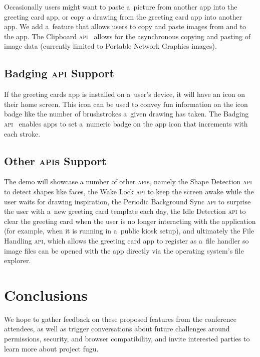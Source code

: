\documentclass[sigconf, anonymous]{acmart}
\begin{document}
Occasionally users might want to paste a~picture from another app into the greeting card app,
or copy a drawing from the greeting card app into another app.
We add a~feature that allows users to copy and paste images from and to the app.
The Clipboard \textsc{api}~\cite{kacmarcik19} allows for the asynchronous copying and pasting
of image data (currently limited to Portable Network Graphics images).

\subsection{Badging \textsc{api} Support}

If the greeting cards app is installed on a~user's device,
it will have an icon on their home screen.
This icon can be used to convey fun information on the icon badge
like the number of brushstrokes a~given drawing has taken.
The Badging \textsc{api}~\cite{giuca19} enables apps to set a~numeric badge on the app icon
that increments with each stroke.

\subsection{Other \textsc{api}s Support}

The demo will showcase a number of other \textsc{api}s, namely the
Shape Detection \textsc{api} to detect shapes like faces,
the Wake Lock  \textsc{api} to keep the screen awake
while the user waits for drawing inspiration, 
the Periodic Background Sync  \textsc{api} to surprise the user
with a~new greeting card template each day,
the Idle Detection \textsc{api} to clear the greeting card
when the user is no longer interacting with the application
(for example, when it is running in a~public kiosk setup),
and ultimately the File Handling \textsc{api}, which allows the greeting card app
to register as a~file handler so image files can be opened 
with the app directly via the operating system's file explorer.

\section{Conclusions}

We hope to gather feedback on these proposed features from the conference attendees,
as well as trigger conversations about future challenges around
permissions, security, and browser compatibility,
and invite interested parties to learn more about project fugu.
\end{document}
